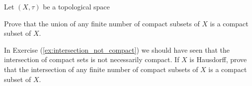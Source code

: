 \item Let $(X,\tau)$ be a topological space

\ba

\item Prove that the union of any finite number of compact subsets of $X$ is a compact subset of $X$.

\item In Exercise (\ref{ex:intersection_not_compact}) we should have seen that the intersection of compact sets is not necessarily compact. If $X$ is Hausdorff, prove that the intersection of any finite number of compact subsets of $X$ is a compact subset of $X$.

\ea

\begin{comment}

\ExerciseSolution

\ba

\item Let $n$ be a positive integer and let $C_1$, $C_2$, $\ldots$, $C_n$ be compact subsets of $X$. Suppose $\{O_{\alpha}\}_{\alpha \in I}$ is an open cover of $\bigcup_{1 \leq k \leq n} C_k$. Let $k$ be between $1$ and $n$. Then $\{O_{\alpha}\}_{\alpha \in I}$ is an open cover of $C_k$. Since $C_k$ is compact, there is an open subcover $\{O_{\gamma}\}_{\gamma \in J_k}$ of $C_k$ for some finite set $J_k$. Thus, $\{O_{\delta}\}_{\delta \in \cup_{1 \leq i \leq n} J_k}$ is a finite subcover of $\bigcup_{1 \leq k \leq n} C_k$. 

\item Assume that $X$ is Hausdorff, let $n$ be a positive integer, and let $C_1$, $C_2$, $\ldots$, $C_n$ be compact subsets of $X$. Suppose $\{O_{\alpha}\}_{\alpha \in I}$ is an open cover of $\bigcap_{1 \leq k \leq n} C_k$. Let $m$ be between $1$ and $n$. Since $C_m$ is a compact subset of a Hausdorff space, we know that $C_m$ is closed. Thus, $X \setminus C_m$ is open. Recall that $X \setminus \bigcap_{1 \leq k \leq n} C_k = \bigcup_{1 \leq k \leq n} (X \setminus C_k)$, so $O = X \setminus \bigcap_{1 \leq k \leq n} C_k$ is open. Since $\bigcap_{1 \leq K \leq N} C_k \subseteq \bigcup_{\alpha \in I} O_{\alpha}$, it follows that $X = O \cup \left(\bigcup_{\alpha \in I} O_{\alpha} \right)$ and so $\{O\} \cup \{O_{\alpha}\}_{\alpha \in I} $ is an open cover for $C_m$. Since $C_m$ is compact, this open cover has a finite subcover. Let $\{O_{i}\}_{i \in J_m}$ be the finite collection of the $O_{\alpha}$ in this subcover. The fact that $O \bigcap \bigcap_{1 \leq k \leq n} C_k = \emptyset$ implies that $\bigcap_{1 \leq k \leq n} C_k \subseteq \bigcup_{i \in J_m} O_{i}$. Thus, $\{O_{i}\}_{i \in J_m}$ is a finite subcover of $\{O_{\alpha}\}_{\alpha \in I}$ and $\bigcap_{1 \leq k \leq n} C_k$ is a compact set. 


\ea

\end{comment}

